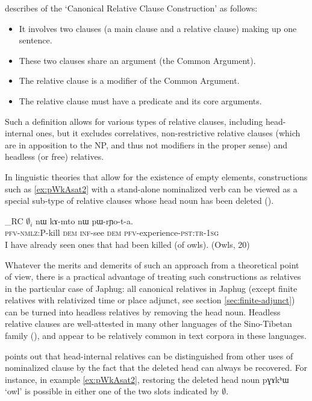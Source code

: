 \documentclass[oldfontcommands,oneside,a4paper,11pt]{article}
\newcommand{\ipa}[1]{{\phon #1}} %
\newcommand{\topic}{\textsc{dem}}
\begin{document}
 \citet[314]{dixon10basic2}  describes of the `Canonical Relative Clause Construction' as follows:
 
\begin{itemize}
\item It involves two clauses (a main clause and a relative clause) making up one sentence. 
\item These two clauses share an argument (the Common Argument). 
\item The relative clause is a modifier of the Common Argument. 
\item The relative clause must have a predicate and its core arguments. 
\end{itemize}
 
Such a definition allows for various types of relative clauses, including head-internal ones, but it excludes correlatives, non-restrictive relative clauses (which are in apposition to the NP, and thus not modifiers in the proper sense) and headless (or free) relatives.

In linguistic theories that  allow for the existence of empty elements, constructions such as \ref{ex:pWkAsat2} with a stand-alone nominalized verb can be viewed as a special sub-type of relative clauses whose head noun has been deleted (\citealt[197-205]{dryer07noun.phrase}). 


   \begin{exe}
\ex \label{ex:pWkAsat2}
\gll [$\emptyset_i$ \ipa{pɯ-kɤ-sat}]_{RC}  $\emptyset_i$ 	\ipa{nɯ}  	\ipa{kɤ-mto}  	\ipa{nɯ}  	\ipa{pɯ-rɲo-t-a.}  \\
{ }  \textsc{pfv-nmlz:P}-kill { } \topic{} \textsc{inf}-see \topic{} \textsc{pfv}-experience-\textsc{pst:tr-1sg} \\
\glt I have already seen ones that had been killed (of owls). (Owls, 20)
  \end{exe}

Whatever the merits and demerits of such an approach from a theoretical point of view, there is a practical advantage of treating such constructions as relatives in the particular case of Japhug: all canonical relatives in Japhug (except  finite relatives with relativized time or place adjunct, see section \ref{sec:finite-adjunct}) can be turned into headless relatives by removing the head noun. Headless relative clauses are well-attested in many other languages of the Sino-Tibetan family (\citealt[128-9]{genetti08nmlz}), and appear to be relatively common in text corpora in these languages.

\citet[227]{coupe07mongsen} points out that head-internal relatives can be distinguished from other uses of nominalized clause by the fact that the deleted head can always be recovered. For instance, in example \ref{ex:pWkAsat2}, restoring the deleted head noun \ipa{pɣɤkʰɯ} `owl' is possible in either one of the two slots indicated by $\emptyset$.
\end{document}
